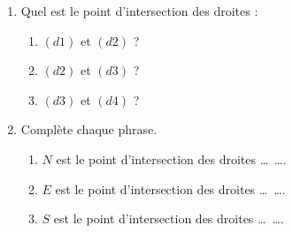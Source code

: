 \documentclass[a4paper,10pt]{report}
\begin{document}
\begin{ex}

\medskip
\begin{enumerate}
\item Quel est le point d'intersection des droites :
\begin{enumerate}
\item[•]$(d1)$ et $(d2)$ ?
\item[•]$(d2)$ et $(d3)$ ?
\item[•]$(d3)$ et $(d4)$ ?
\end{enumerate}
\item Complète chaque phrase.
\begin{enumerate}
\medskip
\item[•] $N$ est le point d'intersection des droites \dots ~\dots.\medskip
\item[•] $E$ est le point d'intersection des droites \dots ~\dots.\medskip
\item[•] $S$ est le point d'intersection des droites \dots ~\dots.
\end{enumerate}
\end{enumerate}


\end{ex}
\end{document}
